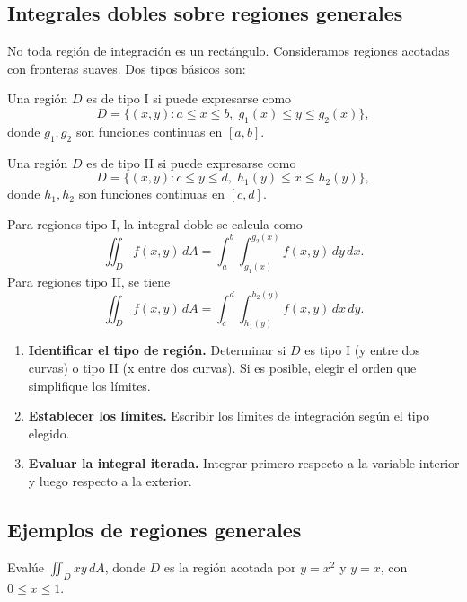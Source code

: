\subsection{Integrales dobles sobre regiones generales}

No toda región de integración es un rectángulo. Consideramos regiones acotadas con fronteras suaves. Dos tipos básicos son:

\begin{definition}
Una región $D$ es de tipo I si puede expresarse como
\[
D=\{(x,y): a\le x\le b,\; g_1(x)\le y\le g_2(x)\},
\]
donde $g_1,g_2$ son funciones continuas en $[a,b]$.
\end{definition}

\begin{definition}
Una región $D$ es de tipo II si puede expresarse como
\[
D=\{(x,y): c\le y\le d,\; h_1(y)\le x\le h_2(y)\},
\]
donde $h_1,h_2$ son funciones continuas en $[c,d]$.
\end{definition}

Para regiones tipo I, la integral doble se calcula como
\[
\iint_D f(x,y)\,dA = \int_a^b \int_{g_1(x)}^{g_2(x)} f(x,y)\,dy\,dx.
\]
Para regiones tipo II, se tiene
\[
\iint_D f(x,y)\,dA = \int_c^d \int_{h_1(y)}^{h_2(y)} f(x,y)\,dx\,dy.
\]

\begin{pasos}
\begin{enumerate}
    \item \textbf{Identificar el tipo de región.} Determinar si $D$ es tipo I (y entre dos curvas) o tipo II (x entre dos curvas). Si es posible, elegir el orden que simplifique los límites.
    \item \textbf{Establecer los límites.} Escribir los límites de integración según el tipo elegido.
    \item \textbf{Evaluar la integral iterada.} Integrar primero respecto a la variable interior y luego respecto a la exterior.
\end{enumerate}
\end{pasos}

\subsection{Ejemplos de regiones generales}

\begin{example}
Evalúe $\displaystyle\iint_D xy\,dA$, donde $D$ es la región acotada por $y=x^2$ y $y=x$, con $0\le x\le 1$.
\end{example}

